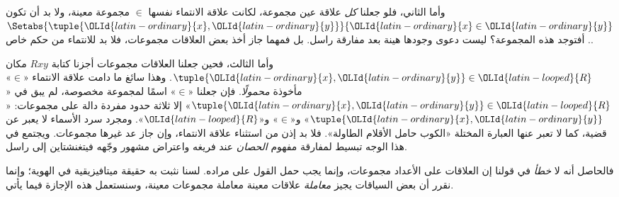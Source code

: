 \documentclass[../../../include/open-logic-section]{subfiles}
\begin{document}
وأما الثاني، فلو جعلنا \emph{كل} علاقة عين مجموعة، لكانت علاقة
الانتماء نفسها $ \in$ مجموعة معينة، ولا بد أن تكون
$\Setabs{\tuple{{\OLId{latin-ordinary}{x}},{\OLId{latin-ordinary}{y}}}}{{\OLId{latin-ordinary}{x}} \in {\OLId{latin-ordinary}{y}}}$. أفتوجد هذه المجموعة؟ ليست دعوى
وجودها هينة بعد مفارقة راسل. بل
فمهما جاز أخذ بعض العلاقات مجموعات، فلا بد للانتماء من حكم خاص.

وأما الثالث، فحين جعلنا العلاقات مجموعات أجزنا كتابة $Rxy$ مكان
$\tuple{{\OLId{latin-ordinary}{x}},{\OLId{latin-ordinary}{y}}} \in {\OLId{latin-looped}{R}}$. وهذا سائغ ما دامت علاقة الانتماء «$\in$»
مأخوذة \emph{محمولًا}. فإن جعلنا «$\in$» اسمًا لمجموعة مخصوصة، لم
يبق في «$\tuple{{\OLId{latin-ordinary}{x}},{\OLId{latin-ordinary}{y}}} \in {\OLId{latin-looped}{R}}$» إلا ثلاثة حدود مفردة دالة على مجموعات:
«$\tuple{{\OLId{latin-ordinary}{x}},{\OLId{latin-ordinary}{y}}}$» و«$\in$» و«${\OLId{latin-looped}{R}}$». ومجرد سرد الأسماء لا يعبر عن قضية،
كما لا تعبر عنها العبارة المختلة «الكوب حامل الأقلام الطاولة».
فلا بد إذن من استثناء علاقة الانتماء، وإن جاز عد غيرها مجموعات.
ويجتمع في هذا الوجه تبسيط لمفارقة مفهوم \emph{الحصان} عند فريغه
واعتراض مشهور وجّهه فيتغنشتاين إلى راسل.

فالحاصل أنه لا \emph{خطأ} في قولنا إن العلاقات على الأعداد مجموعات،
وإنما يجب حمل القول على مراده. لسنا نثبت به حقيقة ميتافيزيقية في
الهوية؛ وإنما نقرر أن بعض السياقات يجيز \emph{معاملة} علاقات معينة
معاملة مجموعات معينة، وسنستعمل هذه الإجازة فيما يأتي.
\end{document}
